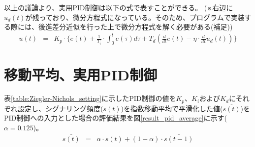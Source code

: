 \documentclass[a4j]{ujarticle}
\begin{document}
以上の議論より、実用PID制御は以下の式で表すことができる。
(※右辺に$u_d(t)$が残っており、微分方程式になっている。そのため、プログラムで実装する際には、後進差分近似を行った上で微分方程式を解く必要がある(補足))
\begin{eqnarray}
  u(t) &=& K_p \cdot \{e(t) + \frac{1}{T_i} \cdot \int_0^t e(\tau) d\tau +  T_d (\frac{d}{dt}e(t) - \eta \cdot \frac{d}{dt}u_d(t))\}
  \label{eq:PID_practice5}
\end{eqnarray}
\clearpage

\section{移動平均、実用PID制御}
表\ref{table:Ziegler-Nichols_setting}に示したPID制御の値を$K_p$、$K_i$および$K_d$にそれぞれ設定し、シグナリング頻度($s(t)$)を指数移動平均で平滑化した値($\overline{s(t)}$)をPID制御への入力とした場合の評価結果を図\ref{result_pid_average}に示す($\alpha = 0.125$)。
\begin{eqnarray}
  \overline{s(t)} &=& \alpha  \cdot s(t) + (1 - \alpha) \cdot \overline{s(t-1)}
  \label{eq:PID_average}
\end{eqnarray}
\end{document}
